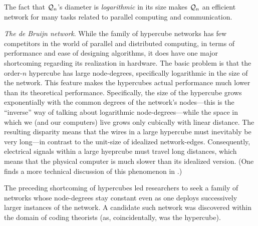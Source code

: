 \medskip

The fact that $\mbox{$\cal Q$}_n$'s diameter is {\em logarithmic} in its size makes
$\mbox{$\cal Q$}_n$ an efficient network for many tasks related to parallel
computing and communication.

\bigskip

{\it The de Bruijn network}.
%
While the family of hypercube networks has few competitors in the
world of parallel and distributed computing, in terms of performance
and ease of designing algorithms, it does have one major shortcoming
regarding its realization in hardware.  The basic problem is that the
order-$n$ hypercube has large node-degrees, specifically logarithmic
in the size of the network.  This feature makes the hypercubes actual
performance much lower than its theoretical performance.
Specifically, the size of the hypercube grows exponentially with the
common degrees of the network's nodes---this is the ``inverse'' way
of talking about logarithmic node-degrees---while the space in which
we (and our computers) live grows only cubically with linear
distance.  The resulting disparity means that the wires in a large
hypercube must inevitably be very long---in contrast to the unit-size
of idealized network-edges.  Consequently, electrical signals within a
large hyeprcube must travel long distances, which means that the
physical computer is much slower than its idealized version.  (One
finds a more technical discussion of this phenomenon in
\cite{Ullman84}.)

The preceding shortcoming of hypercubes led researchers to seek a
family of networks whose node-degrees stay constant even as one
deploys successively larger instances of the network.  A candidate
such network was discovered within the domain of coding theorists (as,
coincidentally, was the hypercube).  

